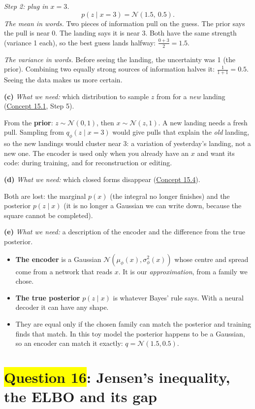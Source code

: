 \documentclass[12pt,a4paper]{article}
\begin{document}
\emph{Step 2: plug in $x=3$.}
\[
p(z\mid x=3)=\mathcal{N}(1.5,\ 0.5).
\]
\emph{The mean in words.} Two pieces of information pull on the guess. The prior says the pull is near 0. The landing says it is near 3. Both have the same strength (variance 1 each), so the best guess lands halfway: $\frac{0+3}{2}=1.5$.

\emph{The variance in words.} Before seeing the landing, the uncertainty was 1 (the prior). Combining two equally strong sources of information halves it: $\frac{1}{1+1}=0.5$. Seeing the data makes us more certain.

\textbf{(c)} \emph{What we need:} which distribution to sample $z$ from for a \emph{new} landing (\hyperref[c15-1]{Concept 15.1}, Step 5).

From the \textbf{prior}: $z\sim\mathcal{N}(0,1)$, then $x\sim\mathcal{N}(z,1)$. A new landing needs a fresh pull. Sampling from $q_\phi(z\mid x=3)$ would give pulls that explain the \emph{old} landing, so the new landings would cluster near 3: a variation of yesterday's landing, not a new one. The encoder is used only when you already have an $x$ and want its code: during training, and for reconstruction or editing.

\textbf{(d)} \emph{What we need:} which closed forms disappear (\hyperref[c15-4]{Concept 15.4}).

Both are lost: the marginal $p(x)$ (the integral no longer finishes) and the posterior $p(z\mid x)$ (it is no longer a Gaussian we can write down, because the square cannot be completed).

\textbf{(e)} \emph{What we need:} a description of the encoder and the difference from the true posterior.
\begin{itemize}[nosep]
  \item \textbf{The encoder} is a Gaussian $\mathcal{N}(\mu_\phi(x),\sigma^2_\phi(x))$ whose centre and spread come from a network that reads $x$. It is our \emph{approximation}, from a family we chose.
  \item \textbf{The true posterior} $p(z\mid x)$ is whatever Bayes' rule says. With a neural decoder it can have any shape.
  \item They are equal only if the chosen family can match the posterior and training finds that match. In this toy model the posterior happens to be a Gaussian, so an encoder can match it exactly: $q=\mathcal{N}(1.5,0.5)$.
\end{itemize}
\newpage
\section{\texorpdfstring{\colorbox{yellow}{Question 16}}{Question 16}: Jensen's inequality, the ELBO and its gap}
\end{document}
